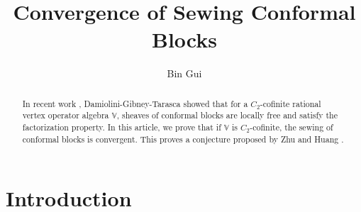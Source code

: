 \documentclass[12pt,a4paper,notitlepage]{article}
\title{Convergence of Sewing Conformal Blocks}
\author{{\sc Bin Gui}
}
\date{}
\theoremstyle{definition}
\theoremstyle{plain}
\newcommand{\Vbb}{\mathbb V}
\numberwithin{equation}{section}
\begin{document}
\sloppy %



	\maketitle









\tableofcontents


	











\newpage


\begin{abstract}
In recent work \cite{DGT19b}, Damiolini-Gibney-Tarasca showed that for a $C_2$-cofinite rational vertex operator algebra $\Vbb$, sheaves of conformal blocks are locally free and satisfy the factorization property. In this article, we  prove that if $\Vbb$ is $C_2$-cofinite, the sewing of conformal blocks is convergent. This proves a conjecture proposed by Zhu \cite{Zhu94} and Huang \cite{Hua16}.
\end{abstract}


\section*{Introduction}
\end{document}
